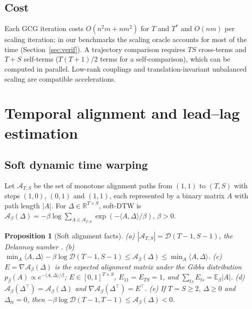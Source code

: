 \documentclass[12pt]{article}
\newtheorem{proposition}{Proposition}
\theoremstyle{definition}
\newcommand{\R}{\mathbb{R}}
\begin{document}
\subsection{Cost}
Each GCG iteration costs $O(n^2m+nm^2)$ for $T$ and $T^\ast$ and $O(nm)$ per scaling iteration; in our benchmarks the scaling oracle accounts for most of the time (Section~\ref{sec:verif}). A trajectory comparison requires $TS$ cross-terms and $T+S$ self-terms ($T(T+1)/2$ terms for a self-comparison), which can be computed in parallel. Low-rank couplings \citep{scetbon2022linear} and translation-invariant unbalanced scaling \citep{sejourne2022faster} are compatible accelerations.

\section{Temporal alignment and lead--lag estimation}
\label{sec:temporal}

\subsection{Soft dynamic time warping}

Let $\mathcal A_{T,S}$ be the set of monotone alignment paths from $(1,1)$ to $(T,S)$ with steps $(1,0)$, $(0,1)$ and $(1,1)$, each represented by a binary matrix $A$ with path length $|A|$. For $\Delta\in\R^{T\times S}$, soft-DTW is \citep{cuturi2017soft} $\mathcal A_\beta(\Delta)=-\beta\log\sum_{A\in\mathcal A_{T,S}}\exp(-\langle A,\Delta\rangle/\beta)$, $\beta>0$.

\begin{proposition}[Soft alignment facts]\label{prop:sdtw}
(a) $|\mathcal A_{T,S}|=\mathcal D(T-1,S-1)$, the Delannoy number \citep{banderier2005delannoy}. (b) $\min_A\langle A,\Delta\rangle-\beta\log\mathcal D(T-1,S-1)\le\mathcal A_\beta(\Delta)\le\min_A\langle A,\Delta\rangle$. (c) $E=\nabla\mathcal A_\beta(\Delta)$ is the expected alignment matrix under the Gibbs distribution $p_\beta(A)\propto e^{-\langle A,\Delta\rangle/\beta}$; $E\in[0,1]^{T\times S}$, $E_{11}=E_{TS}=1$, and $\sum_{ts}E_{ts}=\mathbb E_\beta|A|$. (d) $\mathcal A_\beta(\Delta^\top)=\mathcal A_\beta(\Delta)$ and $\nabla\mathcal A_\beta(\Delta^\top)=E^\top$. (e) If $T=S\ge2$, $\Delta\ge0$ and $\Delta_{tt}=0$, then $-\beta\log\mathcal D(T-1,T-1)\le\mathcal A_\beta(\Delta)<0$.
\end{proposition}
\end{document}
